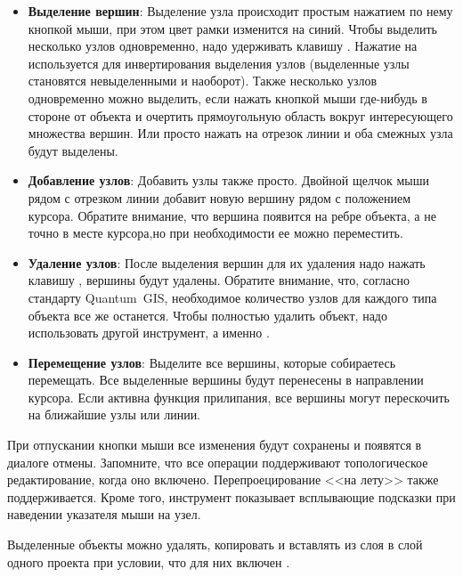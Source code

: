 \begin{itemize}[label=--]
\item \textbf{Выделение вершин}: Выделение узла происходит простым нажатием
по нему кнопкой мыши, при этом цвет рамки изменится на синий. Чтобы выделить
несколько узлов одновременно, надо удерживать клавишу
. Нажатие на
 используется для инвертирования выделения узлов (выделенные
узлы становятся невыделенными и наоборот). Также несколько узлов одновременно
можно выделить, если нажать кнопкой мыши где-нибудь в стороне от объекта и
очертить прямоугольную область вокруг интересующего множества вершин. Или
просто нажать на отрезок линии и оба смежных узла будут выделены.
\item \textbf{Добавление узлов}: Добавить узлы также просто. Двойной щелчок
мыши рядом с отрезком линии добавит новую вершину рядом с положением курсора.
Обратите внимание, что вершина появится на ребре объекта, а не точно в
месте курсора,но при необходимости ее можно переместить.
\item \textbf{Удаление узлов}: После выделения вершин для их удаления надо
нажать клавишу , вершины будут удалены. Обратите внимание,
что, согласно стандарту Quantum~GIS, необходимое количество узлов для каждого
типа объекта все же останется. Чтобы полностью удалить объект, надо использовать
другой инструмент, а именно .
\item \textbf{Перемещение узлов}: Выделите все вершины, которые собираетесь
перемещать. Все выделенные вершины будут перенесены в направлении курсора.
Если активна функция прилипания, все вершины могут перескочить на
ближайшие узлы или линии.
\end{itemize}

При отпускании кнопки мыши все изменения будут сохранены и появятся в
диалоге отмены. Запомните, что все операции поддерживают топологическое
редактирование, когда оно включено. Перепроецирование <<на лету>> также
поддерживается. Кроме того, инструмент показывает всплывающие подсказки
при наведении указателя мыши на узел.


Выделенные объекты можно удалять, копировать и вставлять из слоя в слой
одного проекта \qg  при условии, что для них включен
.

